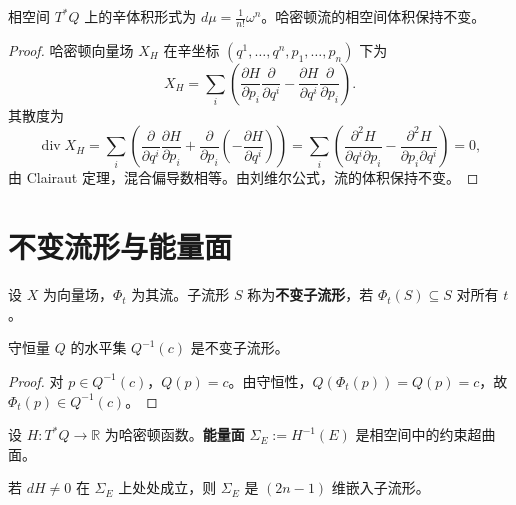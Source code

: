 \begin{proposition}[相空间体积与刘维尔定理]\label{prop:phase_volume_liouville}
相空间 $T^*Q$ 上的辛体积形式为 $d\mu = \frac{1}{n!}\omega^n$。哈密顿流的相空间体积保持不变。
\end{proposition}

\begin{proof}
哈密顿向量场 $X_H$ 在辛坐标 $(q^1, \dots, q^n, p_1, \dots, p_n)$ 下为
\[
X_H = \sum_i \left( \frac{\partial H}{\partial p_i} \frac{\partial}{\partial q^i} - \frac{\partial H}{\partial q^i} \frac{\partial}{\partial p_i} \right).
\]
其散度为
\[
\operatorname{div} X_H = \sum_i \left( \frac{\partial}{\partial q^i} \frac{\partial H}{\partial p_i} + \frac{\partial}{\partial p_i} \left( -\frac{\partial H}{\partial q^i} \right) \right) = \sum_i \left( \frac{\partial^2 H}{\partial q^i \partial p_i} - \frac{\partial^2 H}{\partial p_i \partial q^i} \right) = 0,
\]
由 Clairaut 定理，混合偏导数相等。由刘维尔公式，流的体积保持不变。
\end{proof}

\section{不变流形与能量面}

\begin{definition}[流与不变子流形]\label{def:invariant_submanifold}
设 $X$ 为向量场，$\Phi_t$ 为其流。子流形 $S$ 称为\textbf{不变子流形}，若 $\Phi_t(S) \subseteq S$ 对所有 $t$。
\end{definition}

\begin{proposition}[守恒量水平集是不变子流形]\label{prop:levelset_invariant}
守恒量 $Q$ 的水平集 $Q^{-1}(c)$ 是不变子流形。
\end{proposition}

\begin{proof}
对 $p \in Q^{-1}(c)$，$Q(p) = c$。由守恒性，$Q(\Phi_t(p)) = Q(p) = c$，故 $\Phi_t(p) \in Q^{-1}(c)$。
\end{proof}

\begin{definition}[能量面]\label{def:energy_surface}
设 $H: T^*Q \to \mathbb{R}$ 为哈密顿函数。\textbf{能量面} $\Sigma_E := H^{-1}(E)$ 是相空间中的约束超曲面。
\end{definition}

\begin{proposition}[能量面的维数]\label{prop:energy_surface_dimension}
若 $dH \neq 0$ 在 $\Sigma_E$ 上处处成立，则 $\Sigma_E$ 是 $(2n-1)$ 维嵌入子流形。
\end{proposition}

